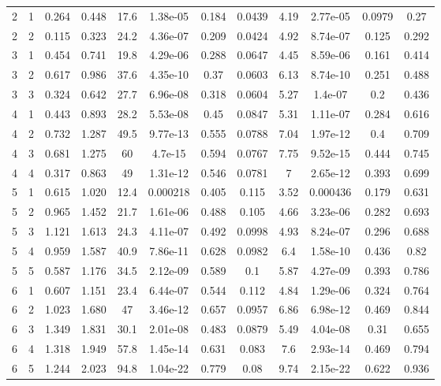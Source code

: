 \begin{table}[h!]
\begin{center}
\begin{tabular}{cccccccccccc}
2 & 1&0.264&0.448&17.6&1.38e-05&0.184&0.0439&4.19&2.77e-05&0.0979&0.27\\
2 & 2&0.115&0.323&24.2&4.36e-07&0.209&0.0424&4.92&8.74e-07&0.125&0.292\\
3 & 1&0.454&0.741&19.8&4.29e-06&0.288&0.0647&4.45&8.59e-06&0.161&0.414\\
3 & 2&0.617&0.986&37.6&4.35e-10&0.37&0.0603&6.13&8.74e-10&0.251&0.488\\
3 & 3&0.324&0.642&27.7&6.96e-08&0.318&0.0604&5.27&1.4e-07&0.2&0.436\\
4 & 1&0.443&0.893&28.2&5.53e-08&0.45&0.0847&5.31&1.11e-07&0.284&0.616\\
4 & 2&0.732&1.287&49.5&9.77e-13&0.555&0.0788&7.04&1.97e-12&0.4&0.709\\
4 & 3&0.681&1.275&60&4.7e-15&0.594&0.0767&7.75&9.52e-15&0.444&0.745\\
4 & 4&0.317&0.863&49&1.31e-12&0.546&0.0781&7&2.65e-12&0.393&0.699\\
5 & 1&0.615&1.020&12.4&0.000218&0.405&0.115&3.52&0.000436&0.179&0.631\\
5 & 2&0.965&1.452&21.7&1.61e-06&0.488&0.105&4.66&3.23e-06&0.282&0.693\\
5 & 3&1.121&1.613&24.3&4.11e-07&0.492&0.0998&4.93&8.24e-07&0.296&0.688\\
5 & 4&0.959&1.587&40.9&7.86e-11&0.628&0.0982&6.4&1.58e-10&0.436&0.82\\
5 & 5&0.587&1.176&34.5&2.12e-09&0.589&0.1&5.87&4.27e-09&0.393&0.786\\
6 & 1&0.607&1.151&23.4&6.44e-07&0.544&0.112&4.84&1.29e-06&0.324&0.764\\
6 & 2&1.023&1.680&47&3.46e-12&0.657&0.0957&6.86&6.98e-12&0.469&0.844\\
6 & 3&1.349&1.831&30.1&2.01e-08&0.483&0.0879&5.49&4.04e-08&0.31&0.655\\
6 & 4&1.318&1.949&57.8&1.45e-14&0.631&0.083&7.6&2.93e-14&0.469&0.794\\
6 & 5&1.244&2.023&94.8&1.04e-22&0.779&0.08&9.74&2.15e-22&0.622&0.936\\

\end{tabular}
\end{center}
\end{table}
